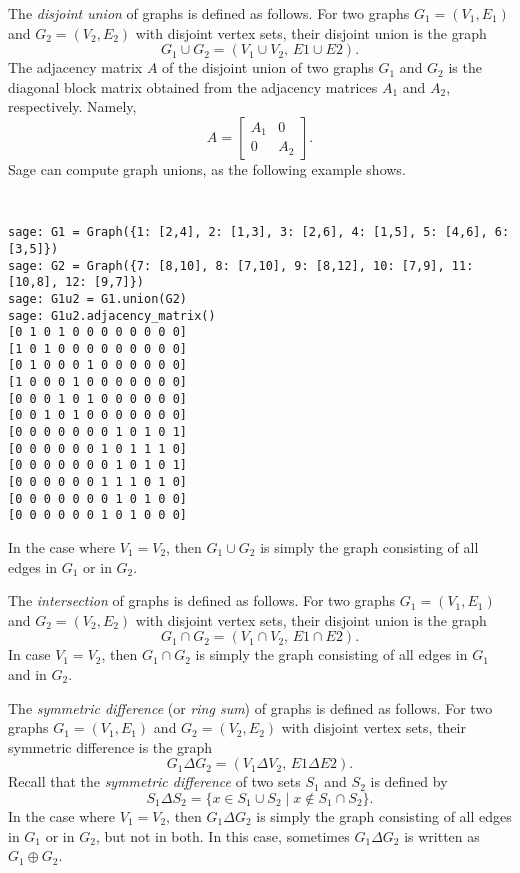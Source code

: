 The \emph{disjoint union} of graphs is defined as follows. For two
graphs $G_1 = (V_1, E_1)$ and $G_2 = (V_2, E_2)$ with disjoint vertex
sets, their disjoint union is the graph
\[
G_1 \cup G_2
=
(V_1 \cup V_2,\, E1 \cup E2).
\]
The adjacency matrix $A$ of the disjoint union of two graphs $G_1$ and
$G_2$ is the diagonal block matrix obtained from the adjacency
matrices $A_1$ and $A_2$, respectively. Namely,
\[
A
=
\begin{bmatrix}
A_1 & 0 \\
0 & A_2
\end{bmatrix}.
\]
%
Sage can compute graph unions, as the following example shows.
%
\begin{center}
\fontsize{9pt}{9pt}
\selectfont
\tt
\begin{lstlisting}
sage: G1 = Graph({1: [2,4], 2: [1,3], 3: [2,6], 4: [1,5], 5: [4,6], 6: [3,5]})
sage: G2 = Graph({7: [8,10], 8: [7,10], 9: [8,12], 10: [7,9], 11: [10,8], 12: [9,7]})
sage: G1u2 = G1.union(G2)
sage: G1u2.adjacency_matrix()
[0 1 0 1 0 0 0 0 0 0 0 0]
[1 0 1 0 0 0 0 0 0 0 0 0]
[0 1 0 0 0 1 0 0 0 0 0 0]
[1 0 0 0 1 0 0 0 0 0 0 0]
[0 0 0 1 0 1 0 0 0 0 0 0]
[0 0 1 0 1 0 0 0 0 0 0 0]
[0 0 0 0 0 0 0 1 0 1 0 1]
[0 0 0 0 0 0 1 0 1 1 1 0]
[0 0 0 0 0 0 0 1 0 1 0 1]
[0 0 0 0 0 0 1 1 1 0 1 0]
[0 0 0 0 0 0 0 1 0 1 0 0]
[0 0 0 0 0 0 1 0 1 0 0 0]
\end{lstlisting}
\end{center}
%
In the case where $V_1 = V_2$, then $G_1 \cup G_2$ is simply the graph
consisting of all edges in $G_1$ or in $G_2$.

The \emph{intersection} of graphs is defined as follows. For two
graphs $G_1 = (V_1, E_1)$ and $G_2 = (V_2, E_2)$ with disjoint vertex
sets, their disjoint union is the graph
\[
G_1 \cap G_2
=
(V_1 \cap V_2,\, E1 \cap E2).
\]
In case $V_1 = V_2$, then $G_1 \cap G_2$ is simply the graph
consisting of all edges in $G_1$ and in $G_2$.

The \emph{symmetric difference} (or \emph{ring sum}) of graphs is
defined as follows. For two graphs $G_1 = (V_1, E_1)$ and
$G_2 = (V_2, E_2)$ with disjoint vertex sets, their symmetric
difference is the graph
\[
G_1 \Delta G_2
=
(V_1 \Delta V_2,\, E1 \Delta E2).
\]
Recall that the \emph{symmetric difference} of two sets $S_1$ and
$S_2$ is defined by
\[
S_1 \Delta S_2
=
\{x \in S_1 \cup S_2 \;|\; x \notin S_1 \cap S_2\}.
\]
In the case where $V_1 = V_2$, then $G_1 \Delta G_2$ is simply the
graph consisting of all edges in $G_1$ or in $G_2$, but not in
both. In this case, sometimes $G_1 \Delta G_2$ is written as
$G_1 \oplus G_2$.
\index{$\Delta$}
\index{$\oplus$}

